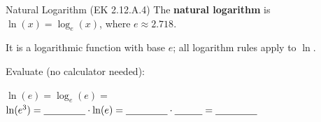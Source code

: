 \documentclass[10pt]{article}
\begin{document}
\vspace{0.08in}

\begin{notesbox}{Natural Logarithm (EK 2.12.A.4)}
The \textbf{natural logarithm} is $\ln(x) = \log_e(x)$, where $e \approx 2.718$.

\vspace{4pt}
It is a logarithmic function with base $e$; all logarithm rules apply to $\ln$.

\vspace{6pt}
Evaluate (no calculator needed):

\vspace{4pt}
$\ln(e) = \log_e(e) = $ \blank{2cm} \qquad $\ln(e^3) = \blank{1.5cm} \cdot \ln(e) = \blank{1.5cm} \cdot \blank{1cm} = \blank{1.5cm}$
\end{notesbox}
\end{document}
